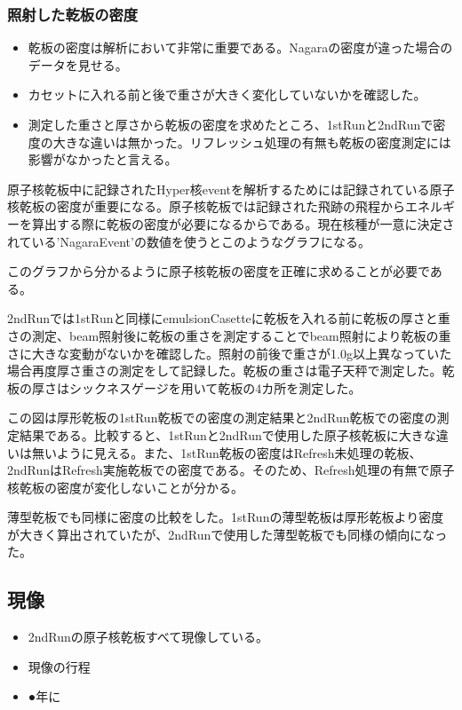 \documentclass[12pt,a4paper]{jarticle}
\begin{document}
\subsubsection{照射した乾板の密度}
\begin{itemize}
 \item 乾板の密度は解析において非常に重要である。Nagaraの密度が違った場合のデータを見せる。
 \item カセットに入れる前と後で重さが大きく変化していないかを確認した。
 \item 測定した重さと厚さから乾板の密度を求めたところ、1stRunと2ndRunで密度の大きな違いは無かった。リフレッシュ処理の有無も乾板の密度測定には影響がなかったと言える。
\end{itemize}
原子核乾板中に記録されたHyper核eventを解析するためには記録されている原子核乾板の密度が重要になる。原子核乾板では記録された飛跡の飛程からエネルギーを算出する際に乾板の密度が必要になるからである。現在核種が一意に決定されている'NagaraEvent'の数値を使うとこのようなグラフになる。\par
このグラフから分かるように原子核乾板の密度を正確に求めることが必要である。\par
2ndRunでは1stRunと同様にemulsionCasetteに乾板を入れる前に乾板の厚さと重さの測定、beam照射後に乾板の重さを測定することでbeam照射により乾板の重さに大きな変動がないかを確認した。照射の前後で重さが1.0g以上異なっていた場合再度厚さ重さの測定をして記録した。乾板の重さは電子天秤で測定した。乾板の厚さはシックネスゲージを用いて乾板の4カ所を測定した。\par
この図は厚形乾板の1stRun乾板での密度の測定結果と2ndRun乾板での密度の測定結果である。比較すると、1stRunと2ndRunで使用した原子核乾板に大きな違いは無いように見える。また、1stRun乾板の密度はRefresh未処理の乾板、2ndRunはRefresh実施乾板での密度である。そのため、Refresh処理の有無で原子核乾板の密度が変化しないことが分かる。\par
薄型乾板でも同様に密度の比較をした。1stRunの薄型乾板は厚形乾板より密度が大きく算出されていたが、2ndRunで使用した薄型乾板でも同様の傾向になった。
\subsection{現像}
\begin{itemize}
 \item 2ndRunの原子核乾板すべて現像している。
 \item 現像の行程
 \item ●年に
\end{itemize}
\end{document}
